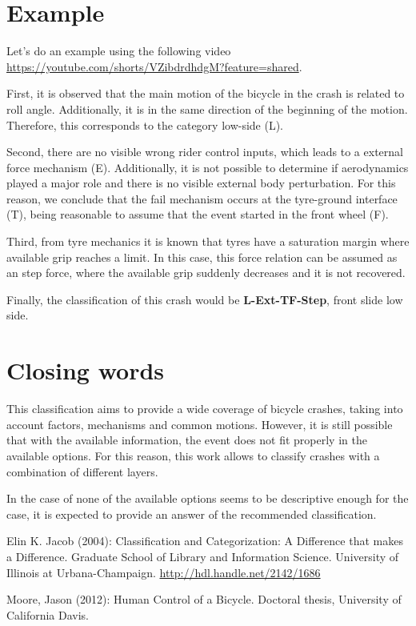 \documentclass{article}
\begin{document}
\section{Example}

Let's do an example using the following video \url{https://youtube.com/shorts/VZibdrdhdgM?feature=shared}.

First, it is observed that the main motion of the bicycle in the crash is related to roll angle.
%
Additionally, it is in the same direction of the beginning of the motion.
%
Therefore, this corresponds to the category low-side (L).


Second, there are no visible wrong rider control inputs, which leads to a external force mechanism (E).
%
Additionally, it is not possible to determine if aerodynamics played a major role and there is no visible external body perturbation.
%
For this reason, we conclude that the fail mechanism occurs at the tyre-ground interface (T), being reasonable to assume that the event started in the front wheel (F).


Third, from tyre mechanics it is known that tyres have a saturation margin where available grip reaches a limit.
%
In this case, this force relation can be assumed as an step force, where the available grip suddenly decreases and it is not recovered.


Finally, the classification of this crash would be \textbf{L-Ext-TF-Step}, front slide low side.


\section{Closing words}

This classification aims to provide a wide coverage of bicycle crashes, taking into account factors, mechanisms and common motions.
%
However, it is still possible that with the available information, the event does not fit properly in the available options.
%
For this reason, this work allows to classify crashes with a combination of different layers.


In the case of none of the available options seems to be descriptive enough for the case, it is expected to provide an answer of the recommended classification.


\begin{thebibliography}{9}

     Elin K. Jacob (2004):  Classification and Categorization: A Difference that makes a Difference. Graduate School of Library and Information Science. University of Illinois at Urbana-Champaign. \url{http://hdl.handle.net/2142/1686}

     Moore, Jason (2012): Human Control of a Bicycle. Doctoral thesis, University of California Davis.


\end{thebibliography}
\end{document}
